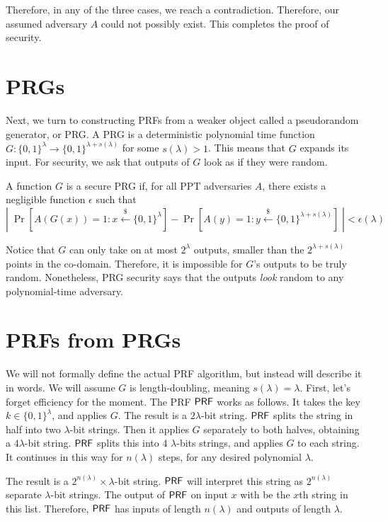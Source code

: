 Therefore, in any of the three cases, we reach a contradiction.  Therefore, our assumed adversary $A$ could not possibly exist.  This completes the proof of security.



\section{PRGs}

Next, we turn to constructing PRFs from a weaker object called a pseudorandom generator, or PRG.  A PRG is a deterministic polynomial time function $G:\{0,1\}^\lambda\rightarrow\{0,1\}^{\lambda+s(\lambda)}$ for some $s(\lambda)>1$.  This means that $G$ expands its input.  For security, we ask that outputs of $G$ look as if they were random.

\begin{definition} A function $G$ is a secure PRG if, for all PPT adversaries $A$, there exists a negligible function $\epsilon$ such that
	\[|\;\Pr[A(G(x))=1:x\stackrel{\$}{\gets}\{0,1\}^\lambda]-\Pr[A(y)=1:y\stackrel{\$}{\gets}\{0,1\}^{\lambda+s(\lambda)}]\;|<\epsilon(\lambda)\]
\end{definition}

Notice that $G$ can only take on at most $2^\lambda$ outputs, smaller than the $2^{\lambda+s(\lambda)}$ points in the co-domain.  Therefore, it is impossible for $G$'s outputs to be truly random.  Nonetheless, PRG security says that the outputs \emph{look} random to any polynomial-time adversary.

\section{PRFs from PRGs}

We will not formally define the actual PRF algorithm, but instead will describe it in words.  We will assume $G$ is length-doubling, meaning $s(\lambda)=\lambda$.  First, let's forget efficiency for the moment.  The PRF ${\sf PRF}$ works as follows.  It takes the key $k\in\{0,1\}^\lambda$, and applies $G$.  The result is a $2\lambda$-bit string.  ${\sf PRF}$ splits the string in half into two $\lambda$-bit strings.  Then it applies $G$ separately to both halves, obtaining a $4\lambda$-bit string.  ${\sf PRF}$ splits this into 4 $\lambda$-bits strings, and applies $G$ to each string.  It continues in this way for $n(\lambda)$ steps, for any desired polynomial $\lambda$.

The result is a $2^{n(\lambda)}\times\lambda$-bit string.  ${\sf PRF}$ will interpret this string as $2^{n(\lambda)}$ separate $\lambda$-bit strings.  The output of ${\sf PRF}$ on input $x$ with be the $x$th string in this list.  Therefore, ${\sf PRF}$ has inputs of length $n(\lambda)$ and outputs of length $\lambda$.

